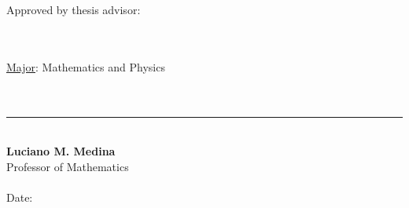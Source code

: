 \documentclass[12pt]{report}
\theoremstyle{definition}
\begin{document}
\begin{tabbing}
    Approved by thesis advisor:

    \hspace*{.50in} \=  \\

    \> \\

    \underline{Major}: Mathematics and Physics \\

    \> \\
    \> \\

    \> \rule[0.0in]{2.5in}{0.01in} \\

    \> \textbf{Luciano M. Medina} \\

    \> Professor of Mathematics \\

    \> \\

    \>  Date: \underline{\hspace{2in}} \\
\end{tabbing}
\end{document}
